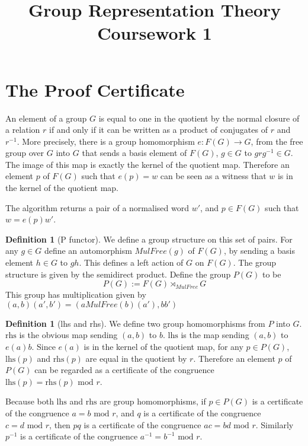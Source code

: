 \documentclass[11pt]{article} %
\title{Group Representation Theory Coursework 1}
\theoremstyle{definition}
\theoremstyle{definition}
\theoremstyle{definition}
\theoremstyle{definition}
\theoremstyle{definition}
\newtheorem{defn}[theorem]{Definition}
\theoremstyle{definition}
\newtheorem{subdef}{Definition}[theorem]
\begin{document}
\raggedright
\section{The Proof Certificate}

An element of a group $G$ is equal to one in the quotient by the normal closure
of a relation $r$ if and only if it can be written as a product of conjugates of $r$ and $r^{-1}$.
More precisely, there is a group homomorphism $e : F(G) \to G$, from the free group
over $G$ into $G$ that sends a basis element of $F(G)$,
$g \in G$ to $grg^{-1} \in G$. The image of this map is exactly the kernel of the quotient map.
Therefore an element $p$ of $F(G)$ such that $e(p) = w$ can be seen as a witness that $w$ is in
the kernel of the quotient map.

The algorithm returns a pair of a normalised word $w'$, and
$p \in F(G)$ such that $w = e(p) w'$.

\begin{defn}[P functor]
  We define a group structure on this set of pairs.
  For any $g \in G$ define an automorphism $MulFree(g)$ of $F(G)$, by sending a basis
  element $h \in G$ to $gh$. This defines a left action of $G$ on $F(G)$. The group
  structure is given by the semidirect product. Define the group $P(G)$ to be
  \begin{equation}
  P(G) := F(G) \rtimes_{MulFree} G
  \end{equation}
  This group has multiplication given by $(a, b) (a', b') = (a MulFree(b)(a'), bb')$
\end{defn}

\begin{subdef}[lhs and rhs]
We define two group homomorphisms from $P$ into $G$. $\text{rhs}$ is the obvious map sending $(a, b)$ to $b$.
$\text{lhs}$ is the map sending $(a,b)$ to $e(a)b$. Since $e(a)$ is in the kernel of the quotient map,
for any $p\in P(G)$, $\text{lhs}(p)$ and $\text{rhs}(p)$ are equal in the quotient by $r$.
Therefore an element $p$ of $P(G)$ can be regarded as a certificate of the congruence
$\text{lhs}(p) = \text{rhs}(p) \text{ mod } r$.
\end{subdef}

Because both $\text{lhs}$ and $\text{rhs}$ are group homomorphisms, if $p \in P(G)$ is a certificate
of the congruence $a = b \text{ mod } r$, and $q$ is a certificate of the congruence
$c = d \text{ mod } r$, then $pq$ is a certificate of the congruence $ac = bd \text{ mod } r$.
Similarly $p^{-1}$ is a certificate of the congruence $a^{-1} = b^{-1} \text{ mod } r$.
\end{document}
